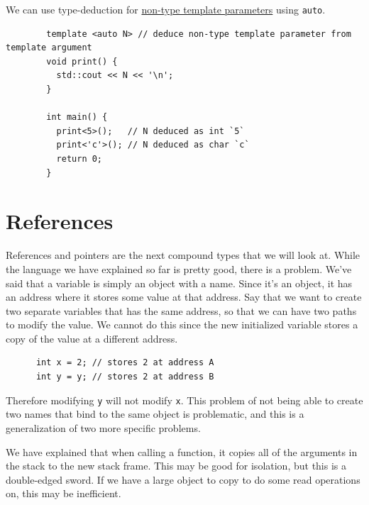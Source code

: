 \documentclass{article}
\newcounter{example}[section]
\begin{document}
    \begin{lemma}
      \label{thm:type-deduction-for-non-type-template-parameters}
 
      We can use type-deduction for \hyperref[def:non-type-template-parameters]{non-type template parameters} using \texttt{auto}. 
      \begin{lstlisting}
        template <auto N> // deduce non-type template parameter from template argument
        void print() {
          std::cout << N << '\n';
        }

        int main() {
          print<5>();   // N deduced as int `5`
          print<'c'>(); // N deduced as char `c`
          return 0;
        } 
      \end{lstlisting}
    \end{lemma} 

\section{References} 

    References and pointers are the next compound types that we will look at. While the language we have explained so far is pretty good, there is a problem. We've said that a variable is simply an object with a name. Since it's an object, it has an address where it stores some value at that address. Say that we want to create two separate variables that has the same address, so that we can have two paths to modify the value. We cannot do this since the new initialized variable stores a copy of the value at a different address. 
    \begin{lstlisting}
      int x = 2; // stores 2 at address A
      int y = y; // stores 2 at address B
    \end{lstlisting}
    Therefore modifying \texttt{y} will not modify \texttt{x}. This problem of not being able to create two names that bind to the same object is problematic, and this is a generalization of two more specific problems. 

    \begin{example}
      \label{ex:copying-during-functions-calls-may-be-expensive}
      We have explained that when calling a function, it copies all of the arguments in the stack to the new stack frame. This may be good for isolation, but this is a double-edged sword. If we have a large object to copy to do some read operations on, this may be inefficient. 
    \end{example}
\end{document}
